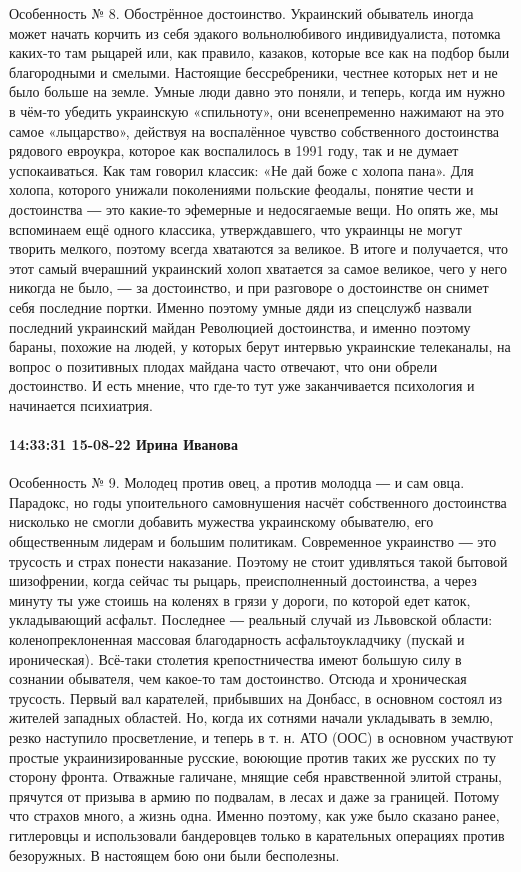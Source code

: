 Особенность № 8. Обострённое достоинство. Украинский обыватель иногда может
начать корчить из себя эдакого вольнолюбивого индивидуалиста, потомка каких-то
там рыцарей или, как правило, казаков, которые все как на подбор были
благородными и смелыми. Настоящие бессребреники, честнее которых нет и не было
больше на земле. Умные люди давно это поняли, и теперь, когда им нужно в чём-то
убедить украинскую «спильноту», они всенепременно нажимают на это самое
«лыцарство», действуя на воспалённое чувство собственного достоинства рядового
евроукра, которое как воспалилось в 1991 году, так и не думает успокаиваться.
Как там говорил классик: «Не дай боже с холопа пана». Для холопа, которого
унижали поколениями польские феодалы, понятие чести и достоинства ― это
какие-то эфемерные и недосягаемые вещи. Но опять же, мы вспоминаем ещё одного
классика, утверждавшего, что украинцы не могут творить мелкого, поэтому всегда
хватаются за великое. В итоге и получается, что этот самый вчерашний украинский
холоп хватается за самое великое, чего у него никогда не было, ― за
достоинство, и при разговоре о достоинстве он снимет себя последние портки.
Именно поэтому умные дяди из спецслужб назвали последний украинский майдан
Революцией достоинства, и именно поэтому бараны, похожие на людей, у которых
берут интервью украинские телеканалы, на вопрос о позитивных плодах майдана
часто отвечают, что они обрели достоинство. И есть мнение, что где-то тут уже
заканчивается психология и начинается психиатрия.

\paragraph{14:33:31 15-08-22 Ирина Иванова}

Особенность № 9. Молодец против овец, а против молодца ― и сам овца. Парадокс,
но годы упоительного самовнушения насчёт собственного достоинства нисколько не
смогли добавить мужества украинскому обывателю, его общественным лидерам и
большим политикам. Современное украинство ― это трусость и страх понести
наказание. Поэтому не стоит удивляться такой бытовой шизофрении, когда сейчас
ты рыцарь, преисполненный достоинства, а через минуту ты уже стоишь на коленях
в грязи у дороги, по которой едет каток, укладывающий асфальт. Последнее ―
реальный случай из Львовской области: коленопреклоненная массовая благодарность
асфальтоукладчику (пускай и ироническая). Всё-таки столетия крепостничества
имеют большую силу в сознании обывателя, чем какое-то там достоинство. Отсюда и
хроническая трусость. Первый вал карателей, прибывших на Донбасс, в основном
состоял из жителей западных областей. Но, когда их сотнями начали укладывать в
землю, резко наступило просветление, и теперь в т. н. АТО (ООС) в основном
участвуют простые украинизированные русские, воюющие против таких же русских по
ту сторону фронта. Отважные галичане, мнящие себя нравственной элитой страны,
прячутся от призыва в армию по подвалам, в лесах и даже за границей. Потому что
страхов много, а жизнь одна. Именно поэтому, как уже было сказано ранее,
гитлеровцы и использовали бандеровцев только в карательных операциях против
безоружных. В настоящем бою они были бесполезны. 

